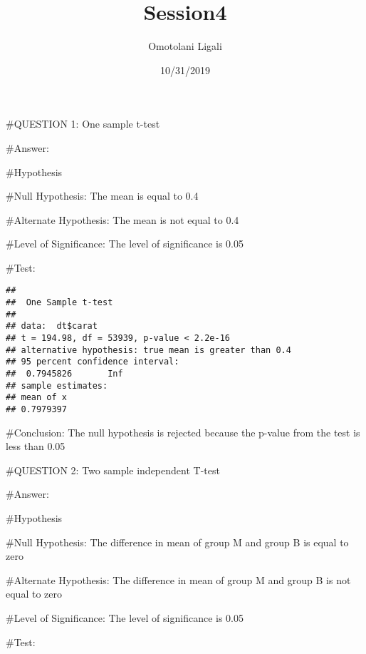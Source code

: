 \documentclass[]{article}
\title{Session4}
\author{Omotolani Ligali}
\date{10/31/2019}
\newenvironment{Shaded}{\begin{snugshade}}{\end{snugshade}}
\newcommand{\DataTypeTok}[1]{\textcolor[rgb]{0.13,0.29,0.53}{#1}}
\newcommand{\FloatTok}[1]{\textcolor[rgb]{0.00,0.00,0.81}{#1}}
\newcommand{\KeywordTok}[1]{\textcolor[rgb]{0.13,0.29,0.53}{\textbf{#1}}}
\newcommand{\NormalTok}[1]{#1}
\newcommand{\OperatorTok}[1]{\textcolor[rgb]{0.81,0.36,0.00}{\textbf{#1}}}
\newcommand{\StringTok}[1]{\textcolor[rgb]{0.31,0.60,0.02}{#1}}
\begin{document}
\maketitle

\#QUESTION 1: One sample t-test

\#Answer:

\#Hypothesis

\#Null Hypothesis: The mean is equal to 0.4

\#Alternate Hypothesis: The mean is not equal to 0.4

\#Level of Significance: The level of significance is 0.05

\#Test:

\begin{Shaded}
\end{Shaded}

\begin{verbatim}
## 
##  One Sample t-test
## 
## data:  dt$carat
## t = 194.98, df = 53939, p-value < 2.2e-16
## alternative hypothesis: true mean is greater than 0.4
## 95 percent confidence interval:
##  0.7945826       Inf
## sample estimates:
## mean of x 
## 0.7979397
\end{verbatim}

\#Conclusion: The null hypothesis is rejected because the p-value from
the test is less than 0.05

\#QUESTION 2: Two sample independent T-test

\#Answer:

\#Hypothesis

\#Null Hypothesis: The difference in mean of group M and group B is
equal to zero

\#Alternate Hypothesis: The difference in mean of group M and group B is
not equal to zero

\#Level of Significance: The level of significance is 0.05

\#Test:

\begin{Shaded}
\end{Shaded}
\end{document}

